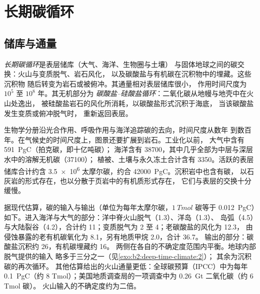 \section{长期碳循环}\label{sec:b2:deep-time-climate:cycle}

\subsection*{储库与通量}

\begin{definition}\label{def:b2:deep-time-climate:carbon-cycle}
\emph{长期碳循环}是表层储库（大气、海洋、生物圈与土壤）
与固体地球之间的碳交换：火山与变质脱气、岩石风化，
以及碳酸盐与有机碳在沉积物中的埋藏。这些沉积物
随后转变为岩石或被俯冲。其通量相对表层储库很小，
作用时间尺度为 $10^5$ 至 $10^8$ 年。其无机部分为
\emph{碳酸盐–硅酸盐循环}：二氧化碳从地幔与地壳中在火山处逸出，
被硅酸盐岩石的风化所消耗，以碳酸盐形式沉积于海底，
当该碳酸盐发生变质或俯冲脱气时，
重新返回表层。
\end{definition}

生物学分册沿光合作用、呼吸作用与海洋追踪碳的去向，时间尺度从数年
到数百年。在气候史的时间尺度上，图景还要扩展到岩石。工业化以前，
大气中含有 \qty{591}{PgC}（拍克碳，即十亿吨碳）；
海洋含有 \num{38700}，其中几乎全部为中层与深层水中的溶解无机碳（\num{37100}）；
植被、土壤与永久冻土合计含有 \num{3350}。活跃的表层储库合计约含
\num{3.5e6} 太摩尔碳，约合 \qty{42000}{PgC}。沉积岩中也含有碳，
以石灰岩的形式存在，也以分散于页岩中的有机质形式存在，
它们与表层的交换十分缓慢。

据现代估算，碳的输入与输出（单位为每年太摩尔碳，$\qty{1}{Tmol}$ 碳等于
\qty{0.012}{PgC}）如下。进入海洋与大气的部分：洋中脊火山脱气（1.3）、洋岛（1.3）、
岛弧（4.5）与大陆裂谷（4.2），合计约 11；变质脱气为 2 至 4；老碳酸盐的风化为 12.3，
由侵蚀暴露的老有机碳氧化为 8.1，另有地质甲烷 2.0，合计 \num{36.7}。
输出的部分：碳酸盐沉积约 26，有机碳埋藏约 16。
两侧在各自的不确定度范围内平衡。地球内部脱气提供的输入
略多于三分之一（见\cref{exo:b2:deep-time-climate:2}）；
其余为沉积碳的再次循环。
其他估算给出的火山通量更低：全球碳预算（IPCC）中为每年
\qty{0.1}{PgC}（约 8 Tmol）；美国地质调查局的一项调查中为
\qty{0.26}{Gt} 二氧化碳（约 6 Tmol 碳）。
火山输入的不确定度约为二倍。

